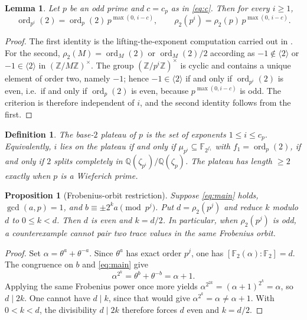 \documentclass[a4paper]{article}
\newtheorem{lemma}[theorem]{Lemma}
\newtheorem{proposition}[theorem]{Proposition}
\newtheorem{definition}[theorem]{Definition}
\newcommand{\F}{\mathbb{F}}
\newcommand{\Z}{\mathbb{Z}}
\newcommand{\Q}{\mathbb{Q}}
\newcommand{\ord}[2][]{\operatorname{ord}_{#1}\!\left(#2\right)}
\begin{document}
\begin{lemma}\label{lem:orders}
	Let $p$ be an odd prime and $c=c_p$ as in \eqref{eq:c}.
	Then for every $i\geq1$,
	\[
		\ord[p^i]{2}=\ord[p]{2}\,p^{\max(0,\,i-c)},
		\qquad
		\rho_2(p^{i})=\rho_2(p)\,p^{\max(0,\,i-c)} .
	\]
\end{lemma}

\begin{proof}
	The first identity is the lifting-the-exponent computation carried out
	in .
	For the second, $\rho_2(M)=\ord[M]{2}$ or $\ord[M]{2}/2$ according as
	$-1\notin\langle2\rangle$ or $-1\in\langle2\rangle$ in
	$(\Z/M\Z)^{\times}$.
	The group $(\Z/p^i\Z)^{\times}$ is cyclic and contains a unique element
	of order two, namely $-1$; hence $-1\in\langle2\rangle$ if and only if
	$\ord[p^i]{2}$ is even, i.e.\ if and only if $\ord[p]{2}$ is even,
	because $p^{\max(0,i-c)}$ is odd.
	The criterion is therefore independent of $i$, and the second identity
	follows from the first.
\end{proof}

\begin{definition}
	The \emph{base-$2$ plateau} of $p$ is the set of exponents
	$1\leq i\leq c_p$.
	Equivalently, $i$ lies on the plateau if and only if
	$\mu_{p^{i}}\subseteq\F_{2^{f_1}}$ with $f_1=\ord[p]{2}$, if and only
	if $2$ splits completely in $\Q(\zeta_{p^{i}})/\Q(\zeta_p)$.
	The plateau has length $\geq2$ exactly when $p$ is a Wieferich prime.
\end{definition}

\begin{proposition}[Frobenius-orbit restriction]\label{prop:frobenius-orbit}
	Suppose \eqref{eq:main} holds, $\gcd(a,p)=1$, and
	$b\equiv\pm2^k a\pmod{p^j}$.
	Put $d=\rho_2(p^j)$ and reduce $k$ modulo $d$ to $0\leq k<d$.
	Then $d$ is even and $k=d/2$.
	In particular, when $\rho_2(p^j)$ is odd, a counterexample cannot pair
	two trace values in the same Frobenius orbit.
\end{proposition}

\begin{proof}
	Set $\alpha=\theta^a+\theta^{-a}$. Since $\theta^a$ has exact order
	$p^j$, one has $[\F_2(\alpha):\F_2]=d$. The congruence on $b$ and
	\eqref{eq:main} give
	\[
		\alpha^{2^k}=\theta^b+\theta^{-b}=\alpha+1.
	\]
	Applying the same Frobenius power once more yields
	$\alpha^{2^{2k}}=(\alpha+1)^{2^k}=\alpha$, so $d\mid2k$.
	One cannot have $d\mid k$, since that would give
	$\alpha^{2^k}=\alpha\neq\alpha+1$.
	With $0<k<d$, the divisibility $d\mid2k$ therefore forces
	$d$ even and $k=d/2$.
\end{proof}
\end{document}
